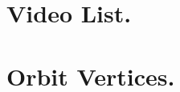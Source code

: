 \documentclass{article}
\begin{document}
%

\appendix
\section{Video List.} 
\label{app:videos}

\section{Orbit Vertices.}
\label{app:orbit-vertices}




%
% 



\end{document}
